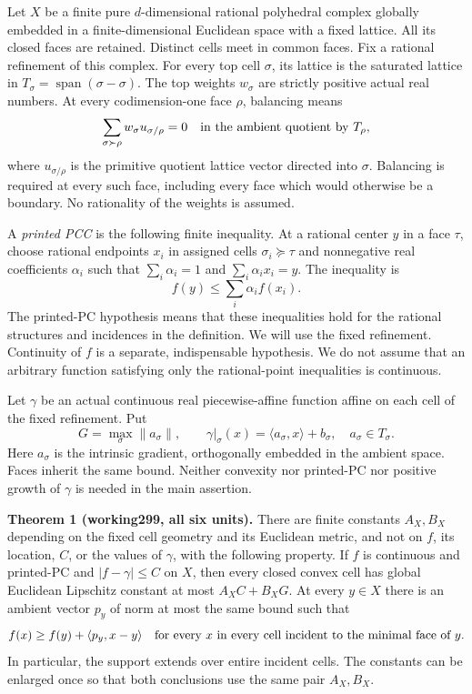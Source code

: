 \documentclass[
  11pt,
]{article}
\begin{document}
Let \(X\) be a finite pure \(d\)-dimensional rational polyhedral complex
globally embedded in a finite-dimensional Euclidean space with a fixed
lattice. All its closed faces are retained. Distinct cells meet in
common faces. Fix a rational refinement of this complex. For every top
cell \(\sigma\), its lattice is the saturated lattice in
\(T_\sigma=\operatorname{span}(\sigma-\sigma)\). The top weights
\(w_\sigma\) are strictly positive actual real numbers. At every
codimension-one face \(\rho\), balancing means \[
\sum_{\sigma\succ\rho} w_\sigma u_{\sigma/\rho}=0
\quad\hbox{in the ambient quotient by }T_\rho,
\] where \(u_{\sigma/\rho}\) is the primitive quotient lattice vector
directed into \(\sigma\). Balancing is required at every such face,
including every face which would otherwise be a boundary. No rationality
of the weights is assumed.

A \emph{printed PCC} is the following finite inequality. At a rational
center \(y\) in a face \(\tau\), choose rational endpoints \(x_i\) in
assigned cells \(\sigma_i\succeq\tau\) and nonnegative real coefficients
\(\alpha_i\) such that \(\sum_i\alpha_i=1\) and
\(\sum_i\alpha_i x_i=y\). The inequality is
\[ f(y)\leq\sum_i\alpha_i f(x_i). \] The printed-PC hypothesis means
that these inequalities hold for the rational structures and incidences
in the definition. We will use the fixed refinement. Continuity of \(f\)
is a separate, indispensable hypothesis. We do not assume that an
arbitrary function satisfying only the rational-point inequalities is
continuous.

Let \(\gamma\) be an actual continuous real piecewise-affine function
affine on each cell of the fixed refinement. Put \[
G=\max_\sigma\|a_\sigma\|,
\qquad \gamma|_\sigma(x)=\langle a_\sigma,x\rangle+b_\sigma,
\quad a_\sigma\in T_\sigma.
\] Here \(a_\sigma\) is the intrinsic gradient, orthogonally embedded in
the ambient space. Faces inherit the same bound. Neither convexity nor
printed-PC nor positive growth of \(\gamma\) is needed in the main
assertion.

\textbf{Theorem 1 (working299, all six units).} There are finite
constants \(A_X,B_X\) depending on the fixed cell geometry and its
Euclidean metric, and not on \(f\), its location, \(C\), or the values
of \(\gamma\), with the following property. If \(f\) is continuous and
printed-PC and \(|f-\gamma|\leq C\) on \(X\), then every closed convex
cell has global Euclidean Lipschitz constant at most \(A_XC+B_XG\). At
every \(y\in X\) there is an ambient vector \(p_y\) of norm at most the
same bound such that \[
f(x)\geq f(y)+\langle p_y,x-y\rangle
\quad\hbox{for every }x\hbox{ in every cell incident to the minimal face of }y.
\] In particular, the support extends over entire incident cells. The
constants can be enlarged once so that both conclusions use the same
pair \(A_X,B_X\).
\end{document}

